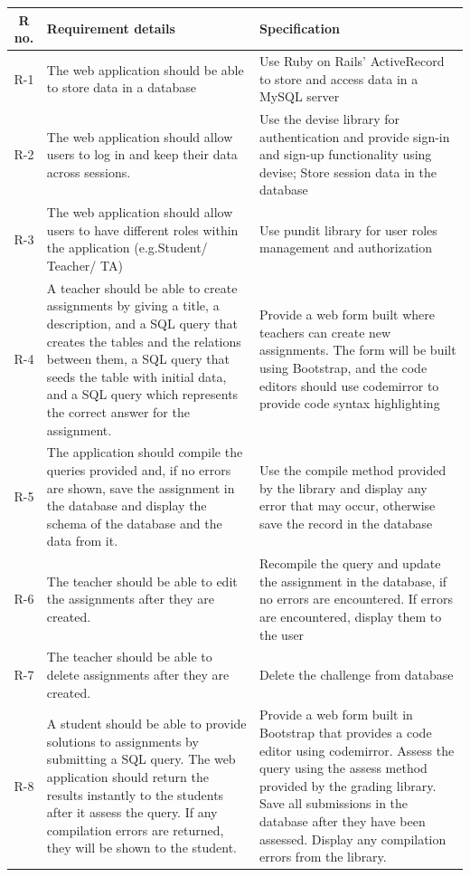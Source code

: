 \begin{tabularx}{\textwidth}{|c|Y|Y|}
  \hline
  \textbf{R no.} & \textbf{Requirement details} & \textbf{Specification} \\\hline
  \endhead
  R-1 & The web application should be able to store data in a database & Use Ruby on Rails' ActiveRecord to store and access data in a MySQL server \\\hline
  R-2 & The web application should allow users to log in and keep their data across sessions. & Use the devise library for authentication and provide sign-in and sign-up functionality using devise; Store session data in the database \\\hline
  R-3 &  The web application should allow users to have different roles within the application (e.g.Student/ Teacher/ TA) & Use pundit library for user roles management and authorization\\\hline
  R-4 &  A teacher should be able to create assignments by giving a title, a description, and a SQL query that creates the tables and the relations between them, a SQL query that seeds the table with initial data, and a SQL query which represents the correct answer for the assignment. & Provide a web form built where teachers can create new assignments. The form will be built using Bootstrap, and the code editors should use codemirror to provide code syntax highlighting \\\hline
  R-5 &  The application should compile the queries provided and, if no errors are shown, save the assignment in the database and display the schema of the database and the data from it. & Use the compile method provided by the library and display any error that may occur, otherwise save the record in the database \\\hline
  R-6 & The teacher should be able to edit the assignments after they are created. & Recompile the query and update the assignment in the database, if no errors are encountered. If errors are encountered, display them to the user \\\hline
  R-7 & The teacher should be able to delete assignments after they are created. & Delete the challenge from database \\\hline
  R-8 & A student should be able to provide solutions to assignments by submitting a SQL query. The web application should return the results instantly to the students after it assess the query. If any compilation errors are returned, they will be shown to the student. & Provide a web form built in Bootstrap that provides a code editor using codemirror. Assess the query using the assess method provided by the grading library. Save all submissions in the database after they have been assessed. Display any compilation errors from the library. \\\hline

\end{tabularx}
